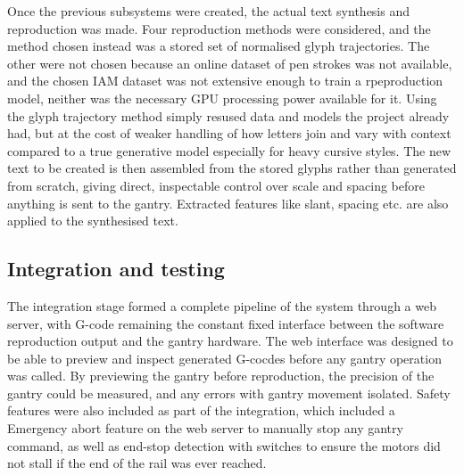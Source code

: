  Once the previous subsystems were created, the actual text synthesis and reproduction was made. Four reproduction methods were considered, and the method chosen instead was a stored set of normalised glyph trajectories. The other were not chosen because an online dataset of pen strokes was not available, and the chosen IAM dataset was not extensive enough to train a rpeproduction model, neither was the necessary GPU processing power available for it. Using the glyph trajectory method simply resused data and models the project already had, but at the cost of weaker handling of how letters join and vary with context compared to a true generative model especially for heavy cursive styles. The new text to be created is then assembled from the stored glyphs rather than generated from scratch, giving direct, inspectable control over scale and spacing before anything is sent to the gantry. Extracted features like slant, spacing etc. are also applied to the synthesised text.

\subsection{Integration and testing}

The integration stage formed a complete pipeline of the system through a web server, with G-code remaining the constant fixed interface between the software reproduction output and the gantry hardware. The web interface was designed to be able to preview and inspect generated G-cocdes before any gantry operation was called. By previewing the gantry before reproduction, the precision of the gantry could be measured, and any errors with gantry movement isolated. Safety features were also included as part of the integration, which included a Emergency abort feature on the web server to manually stop any gantry command, as well as end-stop detection with switches to ensure the motors did not stall if the end of the rail was ever reached. 
